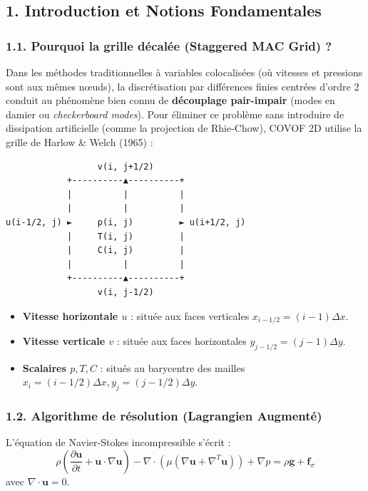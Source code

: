 \documentclass[
  french,
]{article}
\providecommand{\tightlist}{%
  \setlength{\itemsep}{0pt}\setlength{\parskip}{0pt}}
\begin{document}
\subsection{1. Introduction et Notions
Fondamentales}\label{introduction-et-notions-fondamentales}

\subsubsection{1.1. Pourquoi la grille décalée (Staggered MAC Grid)
?}\label{pourquoi-la-grille-duxe9caluxe9e-staggered-mac-grid}

Dans les méthodes traditionnelles à variables colocalisées (où vitesses
et pressions sont aux mêmes nœuds), la discrétisation par différences
finies centrées d'ordre 2 conduit au phénomène bien connu de
\textbf{découplage pair-impair} (modes en damier ou \emph{checkerboard
modes}). Pour éliminer ce problème sans introduire de dissipation
artificielle (comme la projection de Rhie-Chow), COVOF 2D utilise la
grille de Harlow \& Welch (1965) :

\begin{verbatim}
                  v(i, j+1/2)
            +----------▲----------+
            |          |          |
            |          |          |
u(i-1/2, j) ►     p(i, j)         ► u(i+1/2, j)
            |     T(i, j)         |
            |     C(i, j)         |
            |          |          |
            +----------▲----------+
                  v(i, j-1/2)
\end{verbatim}

\begin{itemize}
\tightlist
\item
  \textbf{Vitesse horizontale \(u\)} : située aux faces verticales
  \(x_{i-1/2} = (i-1)\Delta x\).
\item
  \textbf{Vitesse verticale \(v\)} : située aux faces horizontales
  \(y_{j-1/2} = (j-1)\Delta y\).
\item
  \textbf{Scalaires \(p, T, C\)} : situés au barycentre des mailles
  \(x_i = (i-1/2)\Delta x, y_j = (j-1/2)\Delta y\).
\end{itemize}

\subsubsection{1.2. Algorithme de résolution (Lagrangien
Augmenté)}\label{algorithme-de-ruxe9solution-lagrangien-augmentuxe9}

L'équation de Navier-Stokes incompressible s'écrit :
\[\rho \left( \frac{\partial \mathbf{u}}{\partial t} + \mathbf{u} \cdot \nabla \mathbf{u} \right) - \nabla \cdot \left( \mu (\nabla \mathbf{u} + \nabla^T \mathbf{u}) \right) + \nabla p = \rho \mathbf{g} + \mathbf{f}_{\sigma}\]
avec \(\nabla \cdot \mathbf{u} = 0\).
\end{document}

